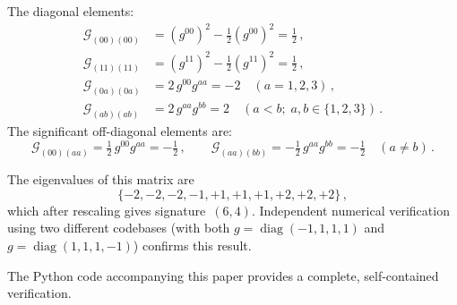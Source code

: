 \documentclass[12pt,a4paper]{article}
\theoremstyle{definition}
\newcommand{\diag}{\operatorname{diag}}
\begin{document}
The diagonal elements:
\begin{align}
\mathcal{G}_{(00)(00)} &= (g^{00})^2 - \tfrac{1}{2}(g^{00})^2 = \tfrac{1}{2}\,,\\
\mathcal{G}_{(11)(11)} &= (g^{11})^2 - \tfrac{1}{2}(g^{11})^2 = \tfrac{1}{2}\,,\\
\mathcal{G}_{(0a)(0a)} &= 2\, g^{00}g^{aa} = -2 \quad (a = 1,2,3)\,,\\
\mathcal{G}_{(ab)(ab)} &= 2\, g^{aa}g^{bb} = 2 \quad (a < b; \; a,b \in \{1,2,3\})\,.
\end{align}
The significant off-diagonal elements are:
\begin{equation}
\mathcal{G}_{(00)(aa)} = \tfrac{1}{2}\, g^{00}g^{aa} = -\tfrac{1}{2}\,, \qquad
\mathcal{G}_{(aa)(bb)} = -\tfrac{1}{2}\, g^{aa}g^{bb} = -\tfrac{1}{2} \quad (a \ne b)\,.
\end{equation}

The eigenvalues of this matrix are
\[
\{-2, -2, -2, -1, +1, +1, +1, +2, +2, +2\}\,,
\]
which after rescaling gives signature~$(6,4)$.
Independent numerical verification using two different codebases (with both $g = \diag(-1,1,1,1)$ and $g = \diag(1,1,1,-1)$) confirms this result.

The Python code accompanying this paper provides a complete, self-contained verification.
\end{document}
